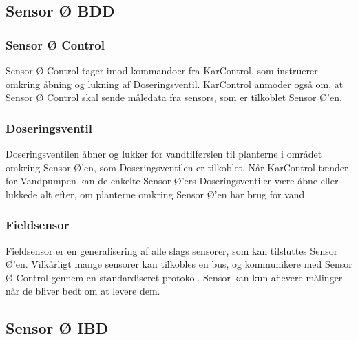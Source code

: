
\subsection{Sensor Ø BDD}

\subsubsection*{Sensor Ø Control}
Sensor Ø Control tager imod kommandoer fra KarControl, som instruerer omkring åbning og lukning af Doseringsventil. KarControl anmoder også om, at Sensor Ø Control skal sende måledata fra sensors, som er tilkoblet Sensor Ø’en.

\subsubsection{Doseringsventil}
Doseringsventilen åbner og lukker for vandtilførslen til planterne i området omkring Sensor Ø’en, som Doseringsventilen er tilkoblet. Når KarControl tænder for Vandpumpen kan de enkelte Sensor Ø’ers Doseringsventiler være åbne eller lukkede alt efter, om planterne omkring Sensor Ø’en har brug for vand.

\subsubsection{Fieldsensor}
Fieldsensor er en generalisering af alle slags sensorer, som kan tilsluttes Sensor Ø’en. Vilkårligt mange sensorer kan tilkobles en bus, og kommunikere med Sensor Ø Control gennem en standardiseret protokol. Sensor kan kun aflevere målinger når de bliver bedt om at levere dem.

\subsection{Sensor Ø IBD}


